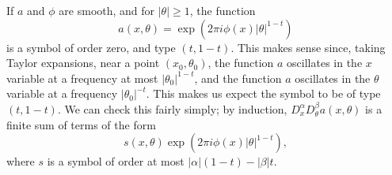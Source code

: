\begin{example}
    If $a$ and $\phi$ are smooth, and for $|\theta| \geq 1$, the function
    \[ a(x,\theta) = \exp \left( 2 \pi i \phi(x) |\theta|^{1 - t} \right) \]
    is a symbol of order zero, and type $(t,1-t)$. This makes sense since, taking Taylor expansions, near a point $(x_0,\theta_0)$, the function $a$ oscillates in the $x$ variable at a frequency at most $|\theta_0|^{1-t}$, and the function $a$ oscillates in the $\theta$ variable at a frequency $|\theta_0|^{-t}$. This makes us expect the symbol to be of type $(t,1-t)$. We can check this fairly simply; by induction, $D^\alpha_x D^\beta_\theta a(x,\theta)$ is a finite sum of terms of the form
    \[ s(x,\theta) \exp \left( 2 \pi i \phi(x) |\theta|^{1-t} \right), \]
    where $s$ is a symbol of order at most $|\alpha| (1-t) - |\beta| t$.
\end{example}

%
%
%
%


